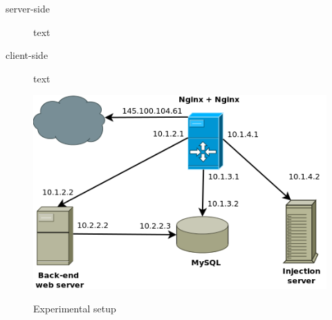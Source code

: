 \documentclass[Methods]{subfiles}
\begin{document}
\begin{description} 
 \item[server-side] text 
 \item[client-side] text
\end{description}

\begin{figure}[h]
\caption{Experimental setup}
\centering
\includegraphics[scale=0.4] {images/infrastructure.png}
\label{fig:Experimental setup}
\end{figure}
\end{document}
